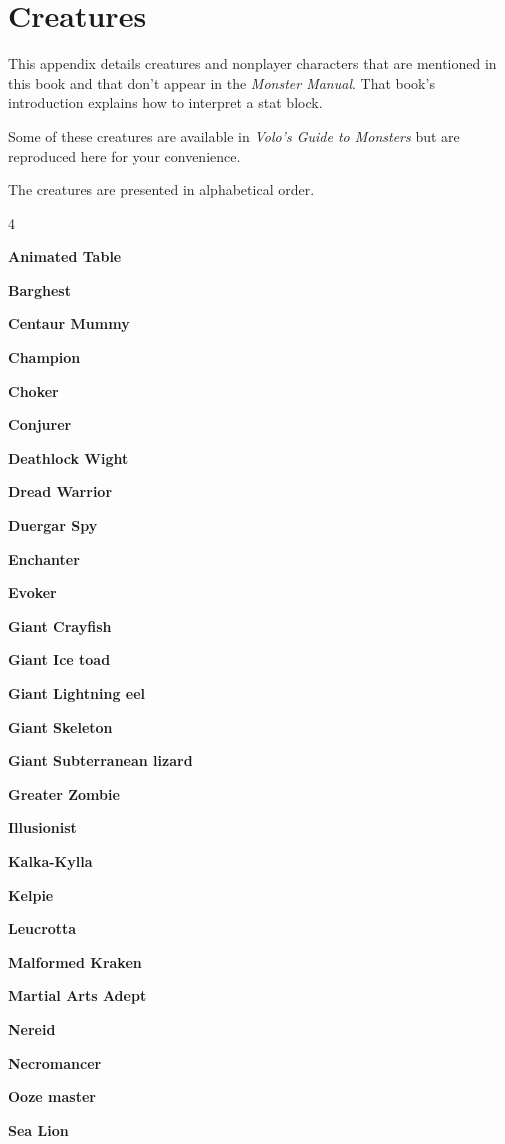 \documentclass[10pt,a4paper,twoside,bg=print,twocolumn,openany,nodeprecatedcode]{dndbook}
\begin{document}
\chapter{Creatures}
This appendix details creatures and nonplayer characters that are mentioned in this book and that don't appear in the \textit{Monster Manual}. That book's introduction explains how to interpret a stat block.

Some of these creatures are available in \textit{Volo's Guide to Monsters} but are reproduced here for your convenience.

The creatures are presented in alphabetical order.


\begin{itemize}
\begin{multicols}{4}
\item \textbf{Animated Table}
\item \textbf{Barghest}
\item \textbf{Centaur Mummy}
\item \textbf{Champion}
\item \textbf{Choker}
\item \textbf{Conjurer}
\item \textbf{Deathlock Wight}
\item \textbf{Dread Warrior}
\item \textbf{Duergar Spy}
\item \textbf{Enchanter}
\item \textbf{Evoker}
\item \textbf{Giant Crayfish}
\item \textbf{Giant Ice toad}
\item \textbf{Giant Lightning eel}
\item \textbf{Giant Skeleton}
\item \textbf{Giant Subterranean lizard}
\item \textbf{Greater Zombie}
\item \textbf{Illusionist}
\item \textbf{Kalka-Kylla}
\item \textbf{Kelpie}
\item \textbf{Leucrotta}
\item \textbf{Malformed Kraken}
\item \textbf{Martial Arts Adept}
\item \textbf{Nereid}
\item \textbf{Necromancer}
\item \textbf{Ooze master}
\item \textbf{Sea Lion}

\end{multicols}
\end{itemize}
\end{document}
